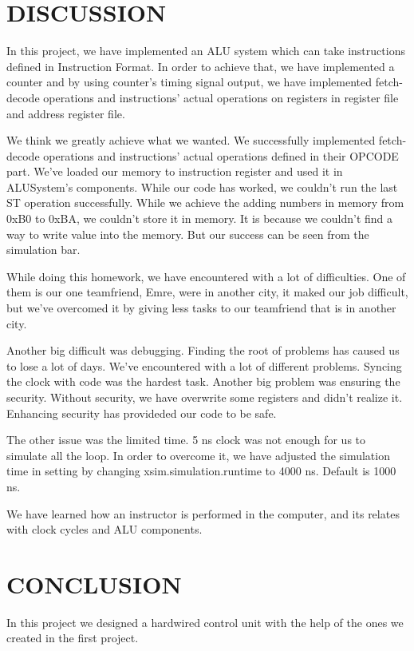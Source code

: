 \documentclass[pdftex,12pt,a4paper]{article}
\begin{document}
\section{DISCUSSION}
    In this project, we have implemented an ALU system which can take instructions defined in
Instruction Format. In order to achieve that, we have implemented a counter and by using counter's 
timing signal output, we have implemented fetch-decode operations and instructions' actual operations on
registers in register file and address register file. 

    We think we greatly achieve what we wanted. We successfully implemented fetch-decode operations
and instructions' actual operations defined in their OPCODE part. We've loaded our memory to instruction
register and used it in ALUSystem's components. While our code has worked, we couldn't run the last ST
operation successfully. While we achieve the adding numbers in memory from 0xB0 to 0xBA, we couldn't store it
in memory. It is because we couldn't find a way to write value into the memory. But our success can be seen
from the simulation bar.

    While doing this homework, we have encountered with a lot of difficulties. One of them is our one teamfriend, Emre,
were in another city, it maked our job difficult, but we've overcomed it by giving less tasks to our teamfriend
that is in another city.

    Another big difficult was debugging. Finding the root of problems has caused us to lose a lot of days.
We've encountered with a lot of different problems. Syncing the clock with code was the hardest task.
Another big problem was ensuring the security. Without security, we have overwrite some registers and
didn't realize it. Enhancing security has provideded our code to be safe. 

    The other issue was the limited time. 5 ns clock was not enough for us to simulate all the loop. In order to
overcome it, we have adjusted the simulation time in setting by changing xsim.simulation.runtime to 4000 ns. Default is
1000 ns.

    We have learned how an instructor is performed in the computer, and its relates with clock cycles and ALU components.


\section{CONCLUSION}
In this project we designed a hardwired control unit with the help of the ones we created in the first project. 
\end{document}
